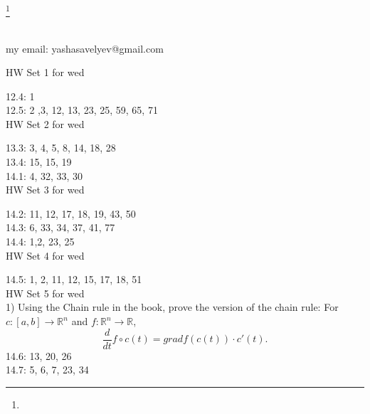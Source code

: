 \documentclass{amsart}
\numberwithin{equation}{section}
\theoremstyle{definition}
\theoremstyle{remark}
\begin{document}
\title{}
\author{Yasha Savelyev}
\thanks {}
\address{University of Colima, CUICBAS}
\keywords{}
\begin{abstract}   
\end{abstract}
\maketitle
\section{}
my email: yashasavelyev@gmail.com

HW Set 1 for wed

12.4: 1  \\
12.5: 2 ,3, 12, 13, 23, 25, 59, 65, 71  \\

HW Set 2 for wed

13.3: 3, 4, 5, 8, 14, 18, 28  \\
13.4: 15, 15, 19 \\
14.1: 4, 32, 33, 30 \\

HW Set 3 for wed

14.2: 11, 12, 17, 18, 19, 43, 50 \\
14.3: 6, 33, 34, 37, 41, 77 \\
14.4: 1,2, 23, 25 \\

HW Set 4 for wed

14.5: 1, 2, 11, 12, 15, 17, 18, 51 \\

HW Set 5 for wed \\

1) Using the Chain rule in the book, prove the version of the chain rule:
For $c: [a,b] \to \mathbb{R} ^{n}$ and $f: \mathbb{R} ^{n}
\to \mathbb{R}$, 
$$\frac{d}{dt} f \circ c (t)  = grad f (c (t)
) \cdot c' (t).
$$ 
14.6: 13, 20, 26 \\
14.7: 5, 6, 7, 23, 34 \\
\end{document}
